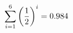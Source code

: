 \documentclass[preview]{standalone}
\begin{document}
\begin{align*}
\sum_{i=1}^{ 6 } \left({ 1 } \over {2} \right)^i = { 0.984 }
\end{align*}
\end{document}

